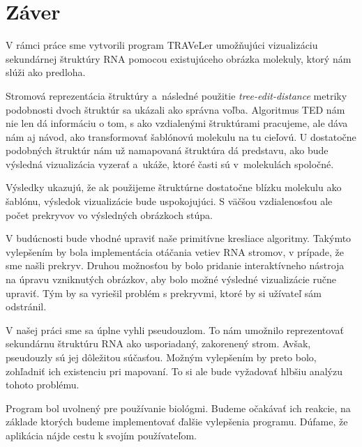 \chapter*{Záver}

V rámci práce sme vytvorili program TRAVeLer umožňujúci
vizualizáciu sekundárnej štruktúry RNA pomocou existujúceho
obrázka molekuly, ktorý nám slúži ako predloha.

Stromová reprezentácia štruktúry a~následné
použitie \textit{tree-edit-distance} metriky podobnosti dvoch
štruktúr sa ukázali ako správna voľba.
Algoritmus TED nám nie len dá informáciu o tom,
s ako vzdialenými štruktúrami pracujeme, ale dáva nám
aj návod, ako transformovať šablónovú molekulu na tu cieľovú.
U dostatočne podobných štruktúr nám už namapovaná štruktúra
dá predstavu, ako bude výsledná vizualizácia vyzerať
a~ukáže, ktoré časti sú v~molekulách spoločné.

Výsledky ukazujú, že ak použijeme štruktúrne dostatočne blízku
molekulu ako šablónu, výsledok vizualizácie bude uspokojujúci.
S väčšou vzdialenosťou ale počet prekryvov vo výsledných obrázkoch
stúpa.

V budúcnosti bude vhodné upraviť naše primitívne kresliace algoritmy.
Takýmto vylepšením by bola implementácia otáčania vetiev RNA stromov,
v prípade, že sme našli prekryv.
Druhou možnosťou by bolo pridanie interaktívneho nástroja na úpravu
vzniknutých obrázkov, aby bolo možné výsledné vizualizácie ručne upraviť.
Tým by sa vyriešil problém s prekryvmi, ktoré by si užívateľ sám odstránil.

V našej práci sme sa úplne vyhli pseudouzlom. To nám umožnilo
reprezentovať sekundárnu štruktúru RNA ako usporiadaný, zakorenený strom.
Avšak, pseudouzly sú jej dôležitou súčasťou.
Možným vylepšením by preto bolo, zohľadniť ich existenciu pri mapovaní.
To si ale bude vyžadovať hlbšiu analýzu tohoto problému.

Program bol uvolnený pre používanie biológmi. Budeme očakávať ich reakcie,
na základe ktorých budeme implementovať ďalšie vylepšenia programu.
Dúfame, že aplikácia nájde cestu k svojím používateľom.

